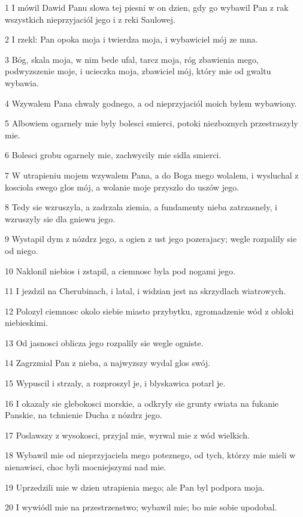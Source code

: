 \par 1 I mówil Dawid Panu slowa tej piesni w on dzien, gdy go wybawil Pan z rak wszystkich nieprzyjaciól jego i z reki Saulowej.
\par 2 I rzekl: Pan opoka moja i twierdza moja, i wybawiciel mój ze mna.
\par 3 Bóg, skala moja, w nim bede ufal, tarcz moja, róg zbawienia mego, podwyzszenie moje, i ucieczka moja, zbawiciel mój, który mie od gwaltu wybawia.
\par 4 Wzywalem Pana chwaly godnego, a od nieprzyjaciól moich bylem wybawiony.
\par 5 Albowiem ogarnely mie byly bolesci smierci, potoki niezboznych przestraszyly mie.
\par 6 Bolesci grobu ogarnely mie, zachwycily mie sidla smierci.
\par 7 W utrapieniu mojem wzywalem Pana, a do Boga mego wolalem, i wysluchal z kosciola swego glos mój, a wolanie moje przyszlo do uszów jego.
\par 8 Tedy sie wzruszyla, a zadrzala ziemia, a fundamenty nieba zatrzasnely, i wzruszyly sie dla gniewu jego.
\par 9 Wystapil dym z nózdrz jego, a ogien z ust jego pozerajacy; wegle rozpalily sie od niego.
\par 10 Naklonil niebios i zstapil, a ciemnosc byla pod nogami jego.
\par 11 I jezdzil na Cherubinach, i latal, i widzian jest na skrzydlach wiatrowych.
\par 12 Polozyl ciemnosc okolo siebie miasto przybytku, zgromadzenie wód z obloki niebieskimi.
\par 13 Od jasnosci oblicza jego rozpalily sie wegle ogniste.
\par 14 Zagrzmial Pan z nieba, a najwyzszy wydal glos swój.
\par 15 Wypuscil i strzaly, a rozproszyl je, i blyskawica potarl je.
\par 16 I okazaly sie glebokosci morskie, a odkryly sie grunty swiata na fukanie Panskie, na tchnienie Ducha z nózdrz jego.
\par 17 Poslawszy z wysokosci, przyjal mie, wyrwal mie z wód wielkich.
\par 18 Wybawil mie od nieprzyjaciela mego poteznego, od tych, którzy mie mieli w nienawisci, choc byli mocniejszymi nad mie.
\par 19 Uprzedzili mie w dzien utrapienia mego; ale Pan byl podpora moja.
\par 20 I wywiódl mie na przestrzenstwo; wybawil mie; bo mie sobie upodobal.
